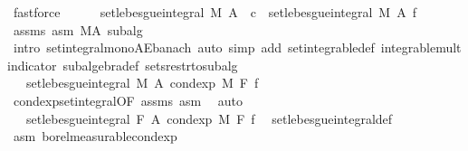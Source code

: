\begin{isabellebody}
\ fastforce\isanewline
\ \ \ \ \isamarkupfalse%
\ {\isachardoublequoteopen}set{\isacharunderscore}{\kern0pt}lebesgue{\isacharunderscore}{\kern0pt}integral\ M\ A\ {\isacharparenleft}{\kern0pt}{\isasymlambda}{\isacharunderscore}{\kern0pt}{\isachardot}{\kern0pt}\ c{\isacharparenright}{\kern0pt}\ {\isasymle}\ set{\isacharunderscore}{\kern0pt}lebesgue{\isacharunderscore}{\kern0pt}integral\ M\ A\ f{\isachardoublequoteclose}\ \isamarkupfalse%
\ assms\ asm\ M{\isacharunderscore}{\kern0pt}A\ subalg\ \isamarkupfalse%
\ {\isacharparenleft}{\kern0pt}intro\ set{\isacharunderscore}{\kern0pt}integral{\isacharunderscore}{\kern0pt}mono{\isacharunderscore}{\kern0pt}AE{\isacharunderscore}{\kern0pt}banach{\isacharcomma}{\kern0pt}\ auto\ simp\ add{\isacharcolon}{\kern0pt}\ set{\isacharunderscore}{\kern0pt}integrable{\isacharunderscore}{\kern0pt}def\ integrable{\isacharunderscore}{\kern0pt}mult{\isacharunderscore}{\kern0pt}indicator\ subalgebra{\isacharunderscore}{\kern0pt}def\ sets{\isacharunderscore}{\kern0pt}restr{\isacharunderscore}{\kern0pt}to{\isacharunderscore}{\kern0pt}subalg{\isacharparenright}{\kern0pt}\isanewline
\ \ \ \ \isamarkupfalse%
\ \isamarkupfalse%
\ {\isachardoublequoteopen}{\isachardot}{\kern0pt}{\isachardot}{\kern0pt}{\isachardot}{\kern0pt}\ {\isacharequal}{\kern0pt}\ set{\isacharunderscore}{\kern0pt}lebesgue{\isacharunderscore}{\kern0pt}integral\ M\ A\ {\isacharparenleft}{\kern0pt}cond{\isacharunderscore}{\kern0pt}exp\ M\ F\ f{\isacharparenright}{\kern0pt}{\isachardoublequoteclose}\ \isamarkupfalse%
\ cond{\isacharunderscore}{\kern0pt}exp{\isacharunderscore}{\kern0pt}set{\isacharunderscore}{\kern0pt}integral{\isacharbrackleft}{\kern0pt}OF\ assms{\isacharparenleft}{\kern0pt}{}{\isacharparenright}{\kern0pt}{\isacharbrackright}{\kern0pt}\ asm\ \isamarkupfalse%
\ auto\isanewline
\ \ \ \ \isamarkupfalse%
\ \isamarkupfalse%
\ {\isachardoublequoteopen}{\isachardot}{\kern0pt}{\isachardot}{\kern0pt}{\isachardot}{\kern0pt}\ {\isacharequal}{\kern0pt}\ set{\isacharunderscore}{\kern0pt}lebesgue{\isacharunderscore}{\kern0pt}integral\ {\isacharquery}{\kern0pt}F\ A\ {\isacharparenleft}{\kern0pt}cond{\isacharunderscore}{\kern0pt}exp\ M\ F\ f{\isacharparenright}{\kern0pt}{\isachardoublequoteclose}\ \isamarkupfalse%
\ set{\isacharunderscore}{\kern0pt}lebesgue{\isacharunderscore}{\kern0pt}integral{\isacharunderscore}{\kern0pt}def\ \isamarkupfalse%
\ asm\ borel{\isacharunderscore}{\kern0pt}measurable{\isacharunderscore}{\kern0pt}cond{\isacharunderscore}{\kern0pt}exp\ \isamarkupfalse%

\end{isabellebody}
